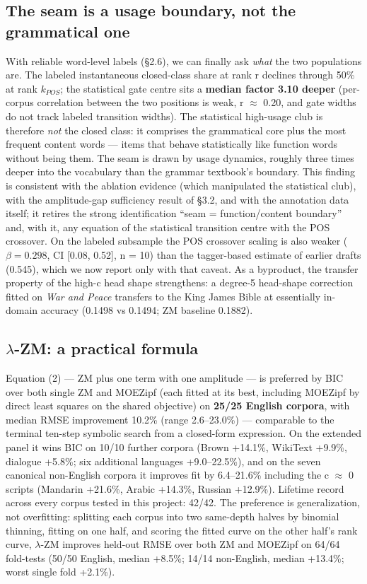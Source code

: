 \documentclass[11pt]{article}
\begin{document}
\subsection{The seam is a usage boundary, not the grammatical one}
With reliable word-level labels (\S2.6), we can finally ask \emph{what} the two populations are. The labeled instantaneous closed-class share at rank r declines through 50\% at rank $k_{POS}$; the statistical gate centre sits a \textbf{median factor 3.10 deeper} (per-corpus correlation between the two positions is weak, r $\approx$ 0.20, and gate widths do not track labeled transition widths). The statistical high-usage club is therefore \emph{not} the closed class: it comprises the grammatical core plus the most frequent content words --- items that behave statistically like function words without being them. The seam is drawn by usage dynamics, roughly three times deeper into the vocabulary than the grammar textbook's boundary. This finding is consistent with the ablation evidence (which manipulated the statistical club), with the amplitude-gap sufficiency result of \S3.2, and with the annotation data itself; it retires the strong identification ``seam = function/content boundary'' and, with it, any equation of the statistical transition centre with the POS crossover. On the labeled subsample the POS crossover scaling is also weaker ($\beta = 0.298$, CI [0.08, 0.52], n = 10) than the tagger-based estimate of earlier drafts (0.545), which we now report only with that caveat. As a byproduct, the transfer property of the high-c head shape strengthens: a degree-5 head-shape correction fitted on \emph{War and Peace} transfers to the King James Bible at essentially in-domain accuracy (0.1498 vs 0.1494; ZM baseline 0.1882).

\subsection{$\lambda$-ZM: a practical formula}
Equation (2) --- ZM plus one term with one amplitude --- is preferred by BIC over both single ZM and MOEZipf (each fitted at its best, including MOEZipf by direct least squares on the shared objective) on \textbf{25/25 English corpora}, with median RMSE improvement 10.2\% (range 2.6--23.0\%) --- comparable to the terminal ten-step symbolic search from a closed-form expression. On the extended panel it wins BIC on 10/10 further corpora (Brown +14.1\%, WikiText +9.9\%, dialogue +5.8\%; six additional languages +9.0--22.5\%), and on the seven canonical non-English corpora it improves fit by 6.4--21.6\% including the c $\approx$ 0 scripts (Mandarin +21.6\%, Arabic +14.3\%, Russian +12.9\%). Lifetime record across every corpus tested in this project: 42/42. The preference is generalization, not overfitting: splitting each corpus into two same-depth halves by binomial thinning, fitting on one half, and scoring the fitted curve on the other half's rank curve, $\lambda$-ZM improves held-out RMSE over both ZM and MOEZipf on 64/64 fold-tests (50/50 English, median +8.5\%; 14/14 non-English, median +13.4\%; worst single fold +2.1\%).
\end{document}
